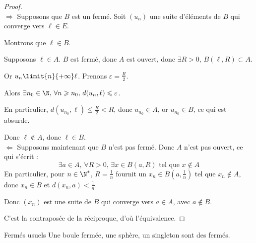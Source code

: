 
\begin{proof}~\\
    $\Rightarrow$ Supposons que $B$ est un fermé.
    Soit $(u_n)$ une suite d'éléments de $B$ qui converge vers $\ell \in E$.

    Montrons que $\ell \in B$.

    Supposons $\ell \in A$. $B$ est fermé, donc $A$ est ouvert, donc $\exists R > 0, \, B(\ell, R) \subset A$.

    Or $u_n \limit{n}{+\infty} \ell$. Prenons $\varepsilon = \frac R 2$. 

    Alors $\exists n_0 \in \N, \, \forall n \geqslant n_0, \, d(u_{n}, \ell) \leqslant \varepsilon$. 

    En particulier, $d(u_{n_0}, \ell) \leqslant \frac R 2 < R$, donc $u_{n_0} \in A$, or $u_{n_0} \in B$, ce qui est absurde.

    Donc $\ell \not \in A$, donc $\ell \in B$. \\

    $\Leftarrow$ Supposons maintenant que $B$ n'est pas fermé. Donc $A$ n'est pas ouvert, ce qui s'écrit : 
    \[\exists a \in A, \, \forall R > 0, \, \exists x \in B(a, R) \text{ tel que } x \not \in A\]
    En particulier, pour $n \in \N^*$, $R = \frac 1 n$ fournit un $x_n \in B\left(a, \frac 1 n\right)$ tel que $x_n \not \in A$, donc $x_n \in B$ 
    et $d(x_n, a) < \frac 1 n$.

    Donc $(x_n)$ est une suite de $B$ qui converge vers $a \in A$, avec $a \not \in B$.

    C'est la contraposée de la réciproque, d'où l'équivalence. 
\end{proof}

\begin{proposition}{Fermés usuels}{}
    Une boule fermée, une sphère, un singleton sont des fermés. 
\end{proposition}


